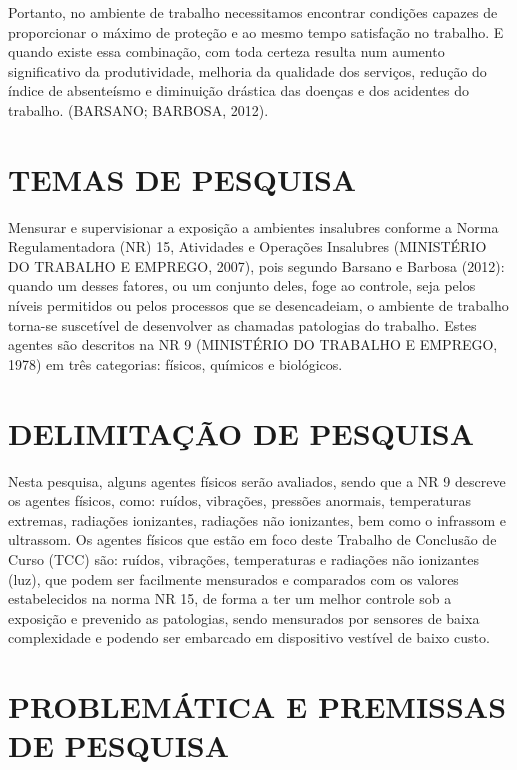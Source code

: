 \begin{citacao}
Portanto, no ambiente de trabalho necessitamos encontrar condições capazes de proporcionar o máximo de proteção e ao mesmo tempo satisfação no trabalho. E quando existe essa combinação, com toda certeza resulta num aumento significativo da produtividade, melhoria da qualidade dos serviços, redução do índice de absenteísmo e diminuição drástica das doenças e dos acidentes do trabalho. (BARSANO; BARBOSA, 2012). 
\end{citacao}

\section{TEMAS DE PESQUISA}
\label{sec:temasDePesquisa}

Mensurar e supervisionar a exposição a ambientes insalubres conforme a Norma Regulamentadora (NR) 15, Atividades e Operações Insalubres (MINISTÉRIO DO TRABALHO E EMPREGO, 2007), pois segundo Barsano e Barbosa (2012): quando um desses fatores, ou um conjunto deles, foge ao controle, seja pelos níveis permitidos ou pelos processos que se desencadeiam, o ambiente de trabalho torna-se suscetível de desenvolver as chamadas patologias do trabalho. Estes agentes são descritos na NR 9 (MINISTÉRIO DO TRABALHO E EMPREGO, 1978) em três categorias: físicos, químicos e biológicos. 

\section{DELIMITAÇÃO DE PESQUISA}
\label{sec:delimitacaoDePesquisa}

Nesta pesquisa, alguns agentes físicos serão avaliados, sendo que a NR 9 descreve os agentes físicos, como: ruídos, vibrações, pressões anormais, temperaturas extremas, radiações ionizantes, radiações não ionizantes, bem como o infrassom e ultrassom.
Os agentes físicos que estão em foco deste Trabalho de Conclusão de Curso (TCC) são: ruídos, vibrações, temperaturas e radiações não ionizantes (luz), que podem ser facilmente mensurados e comparados com os valores estabelecidos na norma NR 15, de forma a ter um melhor controle sob a exposição e prevenido as patologias, sendo mensurados por sensores de baixa complexidade e podendo ser embarcado em dispositivo vestível de baixo custo.

\section{PROBLEMÁTICA E PREMISSAS DE PESQUISA}
\label{sec:problematicaEPremissasDePesquisa}

